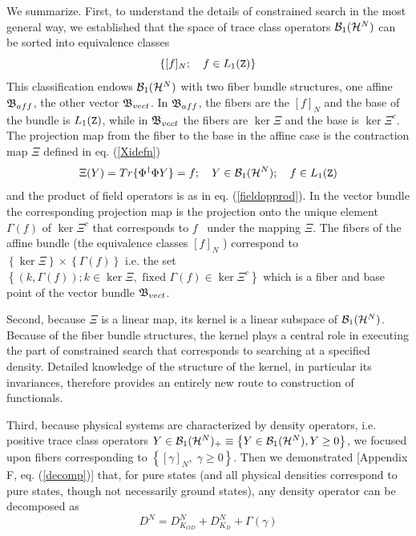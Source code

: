 We summarize. First, to understand the details of constrained search in the
most general way, we established that the space of trace class operators $%
{\cal B}_{1}({\cal H}^{N})$ can be sorted into equivalence classes 
\begin{equation}
\left\{ \lbrack f]_{N};\quad f\in L_{1}({\tt Z})\right\}  \label{summequiv}
\end{equation}%
This classification endows ${\cal B}_{1}({\cal H}^{N})$ with two fiber
bundle structures, one affine ${\frak B}_{aff}$, the other vector ${\frak B}%
_{vect}$. In ${\frak B}_{aff}$, the fibers are the $[f]_{N}$ and the base of
the bundle is $L_{1}({\tt Z})$, while in ${\frak B}_{vect}$ the fibers are $%
\ker \Xi $ and the base is $\ker \Xi ^{c}$. The projection map from the
fiber to the base in the affine case is the contraction map $\Xi $ defined
in eq. (\ref{Xidefn}) 
\begin{equation}
\Xi (Y)=Tr\{\Phi ^{\dagger }\Phi Y\}=f;\quad Y\in {\cal B}_{1}({\cal H}%
^{N});\quad f\in L_{1}({\tt Z})  \label{summXidefn}
\end{equation}%
and the product of field operators is as in eq. (\ref{fieldopprod}). In the
vector bundle the corresponding projection map is the projection onto the
unique element $\Gamma \left( f\right) $ of $\ker \Xi ^{c}$ that corresponds
to $f$ \ under the mapping $\Xi $. The fibers of the affine bundle (the
equivalence classes $[f]_{N}$ ) correspond to $\left\{ \ker \Xi \right\}
\times \left\{ \Gamma \left( f\right) \right\} $ i.e. the set $\left\{
\left( k,\Gamma \left( f\right) \right) ;k\in \ker \Xi ,\text{ fixed }\Gamma
\left( f\right) \in \ker \Xi ^{c}\right\} $ which is a fiber and base point
of the vector bundle ${\frak B}_{vect}$.

Second, because $\Xi $ is a linear map, its kernel is a linear subspace of $%
{\cal B}_{1}({\cal H}^{N})$. Because of the fiber bundle structures, the
kernel plays a central role in executing the part of constrained search that
corresponds to searching at a specified density. Detailed knowledge of the
structure of the kernel, in particular its invariances, therefore provides
an entirely new route to construction of functionals.

Third, because physical systems are characterized by density operators, i.e.
positive trace class operators $Y\in {\cal B}_{1}({\cal H}^{N})_{+}\equiv
\left\{ Y\in {\cal B}_{1}({\cal H}^{N}),Y\geq 0\right\} $, we focused upon
fibers corresponding to $\left\{ [\gamma ]_{N},\;\gamma \geq 0\right\} $.
Then we demonstrated [Appendix F, eq. (\ref{decomp})] that, for pure states
(and all physical densities correspond to pure states, though not
necessarily ground states), any density operator can be decomposed as 
\begin{equation}
D^{N}=D_{K_{OD}}^{N}+D_{K_{D}}^{N}+\Gamma \left( \gamma \right)
\end{equation}

